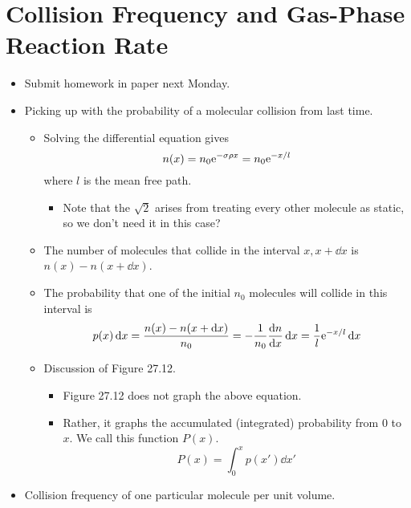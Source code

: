 \documentclass[../notes.tex]{subfiles}
\begin{document}
\section{Collision Frequency and Gas-Phase Reaction Rate}
\begin{itemize}
    \item {}Submit homework in paper next Monday.
    \item Picking up with the probability of a molecular collision from last time.
    \begin{itemize}
        \item Solving the differential equation gives
        \begin{equation*}
            n(x) = n_0\e[-\sigma\rho x]
            = n_0\e[-x/l]
        \end{equation*}
        where $l$ is the mean free path.
        \begin{itemize}
            \item Note that the $\sqrt{2}$ arises from treating every other molecule as static, so we don't need it in this case?
        \end{itemize}
        \item The number of molecules that collide in the interval $x,x+\dd{x}$ is $n(x)-n(x+\dd{x})$.
        \item The probability that one of the initial $n_0$ molecules will collide in this interval is
        \begin{equation*}
            p(x)\dd{x} = \frac{n(x)-n(x+\dd{x})}{n_0}
            = -\frac{1}{n_0}\dv{n}{x}\dd{x}
            = \frac{1}{l}\e[-x/l]\dd{x}
        \end{equation*}
        \item Discussion of Figure 27.12.
        \begin{itemize}
            \item Figure 27.12 does not graph the above equation.
            \item Rather, it graphs the accumulated (integrated) probability from 0 to $x$. We call this function $P(x)$.
            \begin{equation*}
                P(x) = \int_0^xp(x')\dd{x'}
            \end{equation*}
        \end{itemize}
    \end{itemize}
    \item Collision frequency of one particular molecule per unit volume.
    \begin{itemize}

\end{itemize}
\end{itemize}
\end{document}
